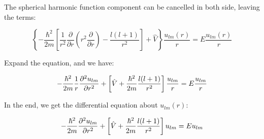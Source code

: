 \documentclass[../main.tex]{subfiles}
\begin{document}
The spherical harmonic function component can be cancelled in both side, leaving the terms:

\begin{equation}
    \left\{-\frac{\hbar^2}{2m}[\frac{1}{r^2}\frac{\partial}{\partial r}(r^2 \frac{\partial}{\partial r}) - \frac{l(l+1)}{r^2}] + \hat{V}\right\}\frac{u_{lm}(r)}{r} = E \frac{u_{lm}(r)}{r}
\end{equation}

Expand the equation, and we have:

\begin{equation}
    -\frac{\hbar^2}{2m} \frac{1}{r}\pdv[2]{u_{lm}}{r} + \left[\hat{V} + \frac{\hbar^2}{2m} \frac{l(l+1)}{r^2} \right]\frac{u_{lm}}{r} = E\frac{u_{lm}}{r}
\end{equation}

In the end, we get the differential equation about $u_{lm}(r)$:

\begin{equation}
    -\frac{\hbar^2}{2m}\pdv[2]{u_{lm}}{r} + \left[\hat{V} + \frac{\hbar^2}{2m} \frac{l(l+1)}{r^2} \right]u_{lm} = E u_{lm}
\end{equation}
\end{document}
